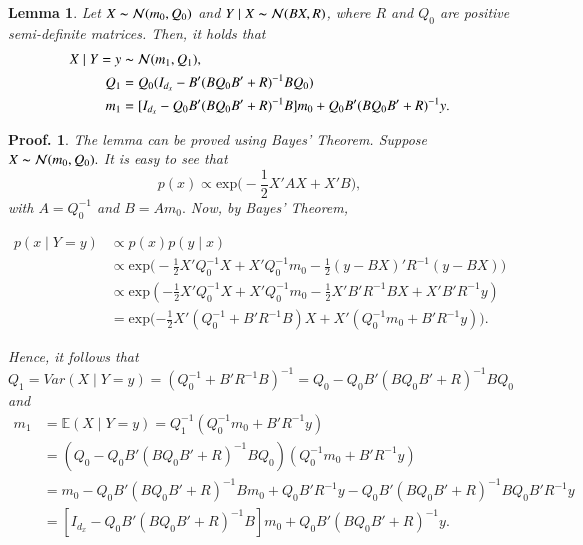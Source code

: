 \documentclass[
]{book}
\theoremstyle{break}
\newtheorem{lemma}{Lemma}
\theoremstyle{nonumberplain}
\newtheorem{proof*}{Proof.}
\begin{document}
\begin{lemma}\label{kalman-filter}
  Let $X\thicksim\mathcal N(m_0,Q_0)$ and $Y\mid X\thicksim\mathcal N(BX,R)$, where $R$ and $Q_0$ are positive semi-definite matrices. 
  Then, it holds that
  \begin{align}
    X\mid Y=y&\thicksim\mathcal N(m_1,Q_1),\\
    Q_1&= Q_0 (I_{d_x} - B'(B Q_0 B'+ R)^{-1} B Q_0) \\
    m_1&=[I_{d_x} - Q_0 B'(B Q_0 B'+ R)^{-1} B ]m_0 + Q_0 B'(B Q_0 B'+ R)^{-1}y.
  \end{align}
\end{lemma}
\begin{proof*}
   The lemma can be proved using Bayes' Theorem. Suppose $X\thicksim\mathcal N(m_0, Q_0).$ It is easy to see that
\begin{equation} \label{normal-distrib-rewrite}
        p(x)\propto \text{exp}\Big(-\frac{1}{2}X'AX + X'B\Big),
\end{equation}
with $A=Q_0^{-1}$ and $B=Am_0.$
Now, by Bayes' Theorem, 

    \begin{align*}
        p(x\mid Y=y)  &\propto p(x) p(y\mid x) \\
                    &\propto \text{exp}\Big(-\frac{1}{2}X' Q_0^{-1}X + X' Q_0^{-1}m_0-\frac{1}{2}(y-BX)'R^{-1}(y-BX)) \\
                    &\propto \text{exp}(-\frac{1}{2}X' Q_0^{-1}X + X' Q_0^{-1}m_0-\frac{1}{2}X' B' R^{-1}BX+X' B' R^{-1}y)\\
                    &=\text{exp}(-\frac{1}{2}X'(Q_0^{-1}+B' R^{-1}B)X+
                    X'(Q_0^{-1}m_0+B' R^{-1}y)\Big).
    \end{align*}

Hence, it follows that 
\begin{equation*}
    Q_1=Var(X\mid Y=y)= (Q_0^{-1}+ B' R^{-1} B)^{-1}=Q_0-Q_0 B'(B Q_0 B'+R)^{-1}B Q_0
\end{equation*}
and 
    \begin{align*}
        m_1 &=\mathbb E(X\mid Y=y) = Q_1^{-1}(Q_0^{-1}m_0+B' R^{-1}y)\\
            &= (Q_0-Q_0B'(B Q_0B'+R)^{-1}B Q_0)(Q_0^{-1}m_0+B' R^{-1}y)\\
            &= m_0-Q_0B'(B Q_0B'+R)^{-1}B m_0 + Q_0 B' R^{-1}y - Q_0B'(B Q_0B'+R)^{-1}B Q_0 B' R^{-1}y \\
            &=[I_{d_x} - Q_0 B'(B Q_0 B'+ R)^{-1} B ]m_0 + Q_0 B'(B Q_0 B'+ R)^{-1}y.
    \end{align*}
\end{proof*}
\end{document}
